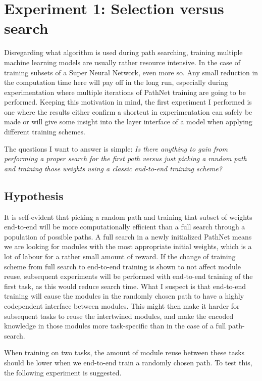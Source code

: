 \chapter{Experiment 1: Selection versus search}\label{exp1}
Disregarding what algorithm is used during path searching, training multiple machine learning models are usually rather resource intensive. In the case of training subsets of a Super Neural Network, even more so. Any small reduction in the computation time here will pay off in the long run, especially during experimentation where multiple iterations of PathNet training are going to be performed. Keeping this motivation in mind, the first experiment I performed is one where the results either confirm a shortcut in experimentation can safely be made or will give some insight into the layer interface of a model when applying different training schemes.

The questions I want to answer is simple: \textit{Is there anything to gain from performing a proper search for the first path versus just picking a random path and training those weights using a classic end-to-end training scheme?}

\section{Hypothesis}
It is self-evident that picking a random path and training that subset of weights end-to-end will be more computationally efficient than a full search through a population of possible paths. A full search in a newly initialized PathNet means we are looking for modules with the most appropriate initial weights, which is a lot of labour for a rather small amount of reward. If the change of training scheme from full search to end-to-end training is shown to not affect module reuse, subsequent experiments will be performed with end-to-end training of the first task, as this would reduce search time. What I suspect is that end-to-end training will cause the modules in the randomly chosen path to have a highly codependent interface between modules. This might then make it harder for subsequent tasks to reuse the intertwined modules, and make the encoded knowledge in those modules more task-specific than in the case of a full path-search. 

When training on two tasks, the amount of module reuse between these tasks should be lower when we end-to-end train a randomly chosen path. To test this, the following experiment is suggested. 

